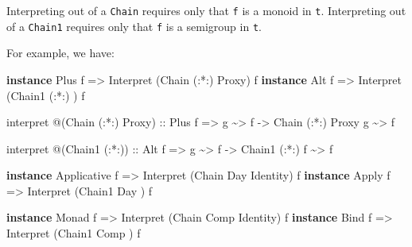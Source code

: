 \documentclass[]{article}
\newenvironment{Shaded}{}{}
\newcommand{\DataTypeTok}[1]{\textcolor[rgb]{0.56,0.13,0.00}{#1}}
\newcommand{\KeywordTok}[1]{\textcolor[rgb]{0.00,0.44,0.13}{\textbf{#1}}}
\newcommand{\NormalTok}[1]{#1}
\newcommand{\OperatorTok}[1]{\textcolor[rgb]{0.40,0.40,0.40}{#1}}
\newcommand{\OtherTok}[1]{\textcolor[rgb]{0.00,0.44,0.13}{#1}}
\begin{document}
\begin{itemize}
  Interpreting out of a \texttt{Chain} requires only that \texttt{f} is a monoid
  in \texttt{t}. Interpreting out of a \texttt{Chain1} requires only that
  \texttt{f} is a semigroup in \texttt{t}.

  For example, we have:

\begin{Shaded}
\begin{Highlighting}[]
\KeywordTok{instance} \DataTypeTok{Plus}\NormalTok{ f }\OtherTok{=\textgreater{}} \DataTypeTok{Interpret}\NormalTok{ (}\DataTypeTok{Chain}\NormalTok{  (}\OperatorTok{:*:}\NormalTok{) }\DataTypeTok{Proxy}\NormalTok{) f}
\KeywordTok{instance} \DataTypeTok{Alt}\NormalTok{  f }\OtherTok{=\textgreater{}} \DataTypeTok{Interpret}\NormalTok{ (}\DataTypeTok{Chain1}\NormalTok{ (}\OperatorTok{:*:}\NormalTok{)      ) f}

\NormalTok{interpret }\OperatorTok{@}\NormalTok{(}\DataTypeTok{Chain}\NormalTok{ (}\OperatorTok{:*:}\NormalTok{) }\DataTypeTok{Proxy}\NormalTok{)}
\OtherTok{    ::} \DataTypeTok{Plus}\NormalTok{ f}
    \OtherTok{=\textgreater{}}\NormalTok{ g }\OperatorTok{\textasciitilde{}\textgreater{}}\NormalTok{ f}
    \OtherTok{{-}\textgreater{}} \DataTypeTok{Chain}\NormalTok{ (}\OperatorTok{:*:}\NormalTok{) }\DataTypeTok{Proxy}\NormalTok{ g }\OperatorTok{\textasciitilde{}\textgreater{}}\NormalTok{ f}

\NormalTok{interpret }\OperatorTok{@}\NormalTok{(}\DataTypeTok{Chain1}\NormalTok{ (}\OperatorTok{:*:}\NormalTok{))}
\OtherTok{    ::} \DataTypeTok{Alt}\NormalTok{ f}
    \OtherTok{=\textgreater{}}\NormalTok{ g }\OperatorTok{\textasciitilde{}\textgreater{}}\NormalTok{ f}
    \OtherTok{{-}\textgreater{}} \DataTypeTok{Chain1}\NormalTok{ (}\OperatorTok{:*:}\NormalTok{) f }\OperatorTok{\textasciitilde{}\textgreater{}}\NormalTok{ f}

\KeywordTok{instance} \DataTypeTok{Applicative}\NormalTok{ f }\OtherTok{=\textgreater{}} \DataTypeTok{Interpret}\NormalTok{ (}\DataTypeTok{Chain}  \DataTypeTok{Day} \DataTypeTok{Identity}\NormalTok{) f}
\KeywordTok{instance} \DataTypeTok{Apply}\NormalTok{       f }\OtherTok{=\textgreater{}} \DataTypeTok{Interpret}\NormalTok{ (}\DataTypeTok{Chain1} \DataTypeTok{Day}\NormalTok{         ) f}

\KeywordTok{instance} \DataTypeTok{Monad}\NormalTok{ f }\OtherTok{=\textgreater{}} \DataTypeTok{Interpret}\NormalTok{ (}\DataTypeTok{Chain}  \DataTypeTok{Comp} \DataTypeTok{Identity}\NormalTok{) f}
\KeywordTok{instance} \DataTypeTok{Bind}\NormalTok{  f }\OtherTok{=\textgreater{}} \DataTypeTok{Interpret}\NormalTok{ (}\DataTypeTok{Chain1} \DataTypeTok{Comp}\NormalTok{         ) f}
\end{Highlighting}
\end{Shaded}
\end{itemize}
\end{document}
